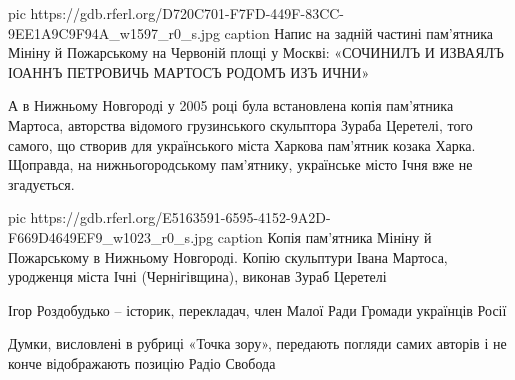	pic https://gdb.rferl.org/D720C701-F7FD-449F-83CC-9EE1A9C9F94A_w1597_r0_s.jpg
	caption Напис на задній частині пам’ятника Мініну й Пожарському на Червоній площі у Москві: «СОЧИНИЛЪ И ИЗВАЯЛЪ ІОАННЪ ПЕТРОВИЧЬ МАРТОСЪ РОДОМЪ ИЗЪ ИЧНИ»
\fi

А в Нижньому Новгороді у 2005 році була встановлена копія пам'ятника Мартоса,
авторства відомого грузинського скульптора Зураба Церетелі, того самого, що
створив для українського міста Харкова пам'ятник козака Харка. Щоправда, на
нижньогородському пам'ятнику, українське місто Ічня вже не згадується.

\ifcmt
  pic https://gdb.rferl.org/E5163591-6595-4152-9A2D-F669D4649EF9_w1023_r0_s.jpg
	caption Копія пам'ятника Мініну й Пожарському в Нижньому Новгороді. Копію скульптури Івана Мартоса, уродженця міста Ічні (Чернігівщина), виконав Зураб Церетелі
\fi

Ігор Роздобудько – історик, перекладач, член Малої Ради Громади українців Росії

Думки, висловлені в рубриці «Точка зору», передають погляди самих авторів і не
конче відображають позицію Радіо Свобода

